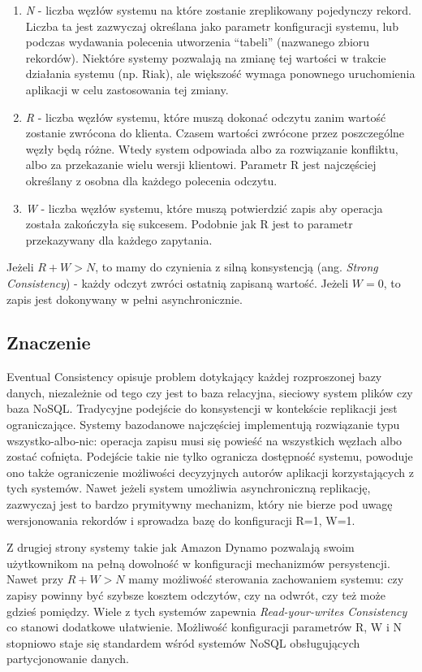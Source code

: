 \begin{enumerate}
 \item \emph{N} - liczba węzłów systemu na które zostanie zreplikowany pojedynczy rekord.
 Liczba ta jest zazwyczaj określana jako parametr konfiguracji systemu, lub podczas wydawania polecenia utworzenia ``tabeli'' (nazwanego zbioru rekordów).
 Niektóre systemy pozwalają na zmianę tej wartości w trakcie działania systemu (np. Riak), ale większość wymaga ponownego uruchomienia aplikacji w celu zastosowania tej zmiany.
 \item \emph{R} - liczba węzłów systemu, które muszą dokonać odczytu zanim wartość zostanie zwrócona do klienta.
 Czasem wartości zwrócone przez poszczególne węzły będą różne.
 Wtedy system  odpowiada albo za rozwiązanie konfliktu, albo za przekazanie wielu wersji klientowi.
 Parametr R jest najczęściej określany z osobna dla każdego polecenia odczytu.
 \item \emph{W} - liczba węzłów systemu, które muszą potwierdzić zapis aby operacja została zakończyła się sukcesem.
 Podobnie jak R jest to parametr przekazywany dla każdego zapytania.
\end{enumerate}

Jeżeli $R+W>N$, to mamy do czynienia z silną konsystencją (ang. \emph{Strong Consistency}) - każdy odczyt zwróci ostatnią zapisaną wartość.
Jeżeli $W = 0$, to zapis jest dokonywany w pełni asynchronicznie.

\subsection*{Znaczenie}

Eventual Consistency opisuje problem dotykający każdej rozproszonej bazy danych, niezależnie od tego czy jest to baza relacyjna, sieciowy system plików czy baza NoSQL.
Tradycyjne podejście do konsystencji w kontekście replikacji jest ograniczające.
Systemy bazodanowe najczęściej implementują rozwiązanie typu wszystko-albo-nic: operacja zapisu musi się powieść na wszystkich węzłach albo zostać cofnięta.
Podejście takie nie tylko ogranicza dostępność systemu, powoduje ono także ograniczenie możliwości decyzyjnych autorów aplikacji korzystających z tych systemów.
Nawet jeżeli system umożliwia asynchroniczną replikację, zazwyczaj jest to bardzo prymitywny mechanizm, który nie bierze pod uwagę wersjonowania rekordów i sprowadza bazę do konfiguracji R=1, W=1.

Z drugiej strony systemy takie jak Amazon Dynamo pozwalają swoim użytkownikom na pełną dowolność w konfiguracji mechanizmów persystencji.
Nawet przy $R+W>N$ mamy możliwość sterowania zachowaniem systemu: czy zapisy powinny być szybsze kosztem odczytów, czy na odwrót, czy też może gdzieś pomiędzy.
Wiele z tych systemów zapewnia \emph{Read-your-writes Consistency} co stanowi dodatkowe ułatwienie.
Możliwość konfiguracji parametrów R, W i N stopniowo staje się standardem wśród systemów NoSQL obsługujących partycjonowanie danych.

